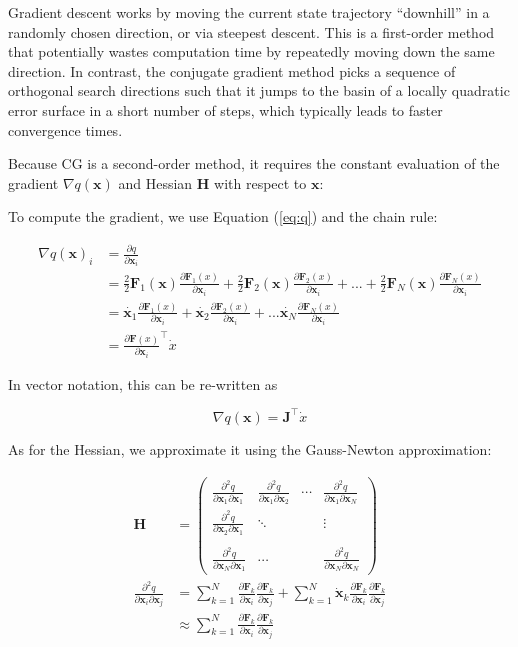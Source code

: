 \documentclass{article} %
\newcommand{\bf}[1]{\mathbf{#1}}
\newcommand{\x}{\bf{x}}
\newcommand{\F}{\bf{F}}
\newcommand{\J}{\bf{J}}
\newcommand{\p}{\partial}
\newcommand{\pf}[2]{\frac{\p{#1}}{\p{#2}}}
\newcommand{\ppf}[3]{\frac{\p^2#1}{\p#2\p#3}}
\begin{document}
Gradient descent works by moving the current state trajectory ``downhill'' in a randomly chosen direction, or via steepest descent. This is a first-order method that potentially wastes computation time by repeatedly moving down the same direction. In contrast, the conjugate gradient method picks a sequence of orthogonal search directions such that it jumps to the basin of a locally quadratic error surface in a short number of steps, which typically leads to faster convergence times.

Because CG is a second-order method, it requires the constant evaluation of the gradient $\nabla q(\x)$ and Hessian $\bf{H}$ with respect to $\x$:

To compute the gradient, we use Equation (\ref{eq:q}) and the chain rule:

\begin{align}
  \nabla q(\x)_i &= \pf{q}{\x_i} \\
  &= \frac{2}{2}{\F_1(\x)\pf{\F_1(x)}{\x_i}} + \frac{2}{2}{\F_2(\x)\pf{\F_2(x)}{\x_i}} + ... +
  \frac{2}{2}{\F_N(\x)\pf{\F_N(x)}{\x_i}} \\
  &=\dot{\x_1}\pf{\F_1(x)}{\x_i} +
  \dot{\x_2}\pf{\F_2(x)}{\x_i}+...\dot{\x_N}\pf{\F_N(x)}{\x_i} \\
  &=\pf{\F(x)}{\x_i}^{\intercal}\dot{x}
\end{align}

In vector notation, this can be re-written as

\begin{equation} \label{eq:Jacobian}
  \nabla q(\x) = \J^{\intercal}\dot{x}
\end{equation}

As for the Hessian, we approximate it using the Gauss-Newton approximation:

\begin{align}
\bf{H} &= \begin{pmatrix}
\ppf{q}{\x_1}{\x_1} & \ppf{q}{\x_1}{\x_2} & \cdots & \ppf{q}{\x_1}{\x_N} \\
\ppf{q}{\x_2}{\x_1} & \ddots &  & \vdots \\
 &  &  & \\
\ppf{q}{\x_N}{\x_1} & \cdots &  & \ppf{q}{\x_N}{\x_N}
\end{pmatrix} \\
\ppf{q}{\x_i}{\x_j} &= \sum_{k=1}^{N}\pf{\F_k}{\x_i}\pf{\F_k}{\x_j} + \sum_{k=1}^{N}{\dot{\x}_k\pf{\F_k}{\x_i}\pf{\F_k}{\x_j}} \\
&\approx \sum_{k=1}^{N}\pf{\F_k}{\x_i}\pf{\F_k}{\x_j}
\end{align}
\end{document}
